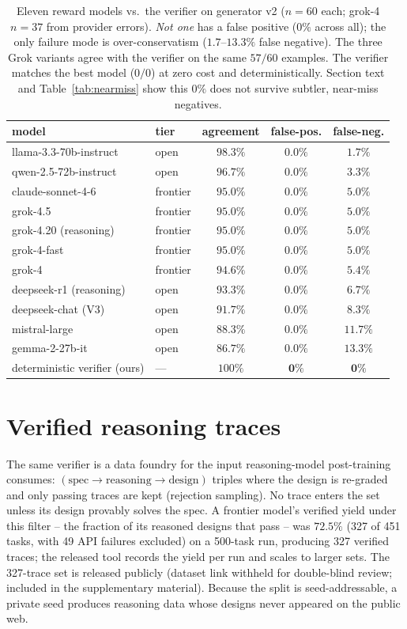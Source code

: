 \documentclass{article}
\begin{document}
\begin{table}[t]
\centering
\small
\begin{tabular}{llccc}
\toprule
model & tier & agreement & false-pos. & false-neg. \\
\midrule
llama-3.3-70b-instruct & open & $98.3\%$ & $\mathbf{0.0\%}$ & $1.7\%$ \\
qwen-2.5-72b-instruct & open & $96.7\%$ & $\mathbf{0.0\%}$ & $3.3\%$ \\
claude-sonnet-4-6 & frontier & $95.0\%$ & $\mathbf{0.0\%}$ & $5.0\%$ \\
grok-4.5 & frontier & $95.0\%$ & $\mathbf{0.0\%}$ & $5.0\%$ \\
grok-4.20 (reasoning) & frontier & $95.0\%$ & $\mathbf{0.0\%}$ & $5.0\%$ \\
grok-4-fast & frontier & $95.0\%$ & $\mathbf{0.0\%}$ & $5.0\%$ \\
grok-4 & frontier & $94.6\%$ & $\mathbf{0.0\%}$ & $5.4\%$ \\
deepseek-r1 (reasoning) & open & $93.3\%$ & $\mathbf{0.0\%}$ & $6.7\%$ \\
deepseek-chat (V3) & open & $91.7\%$ & $\mathbf{0.0\%}$ & $8.3\%$ \\
mistral-large & open & $88.3\%$ & $\mathbf{0.0\%}$ & $11.7\%$ \\
gemma-2-27b-it & open & $86.7\%$ & $\mathbf{0.0\%}$ & $13.3\%$ \\
\midrule
deterministic verifier (ours) & --- & $100\%$ & $\mathbf{0\%}$ & $\mathbf{0\%}$ \\
\bottomrule
\end{tabular}
\caption{Eleven reward models vs.\ the verifier on generator v2 ($n{=}60$ each; grok-4 $n{=}37$ from provider errors). \emph{Not one} has a false positive ($0\%$ across all); the only failure mode is over-conservatism ($1.7$--$13.3\%$ false negative). The three Grok variants agree with the verifier on the same $57/60$ examples. The verifier matches the best model ($0/0$) at zero cost and deterministically. Section text and Table~\ref{tab:nearmiss} show this $0\%$ does not survive subtler, near-miss negatives.}
\label{tab:rewardmodel}
\end{table}

\section{Verified reasoning traces}
The same verifier is a data foundry for the input reasoning-model post-training consumes: $(\text{spec}\to\text{reasoning}\to\text{design})$ triples where the design is re-graded and only passing traces are kept (rejection sampling). No trace enters the set unless its design provably solves the spec. A frontier model's verified yield under this filter -- the fraction of its reasoned designs that pass -- was $72.5\%$ (327 of 451 tasks, with 49 API failures excluded) on a 500-task run, producing 327 verified traces; the released tool records the yield per run and scales to larger sets. The 327-trace set is released publicly (dataset link withheld for double-blind review; included in the supplementary material). Because the split is seed-addressable, a private seed produces reasoning data whose designs never appeared on the public web.
\end{document}
